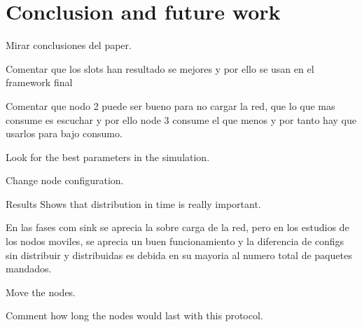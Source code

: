 \chapter{Conclusion and future work}
\label{chap:conclusionsandfuture}

Mirar conclusiones del paper.

Comentar que los slots han resultado se mejores y por ello se usan en el framework final

Comentar que nodo 2 puede ser bueno para no cargar la red, que lo que mas consume es escuchar y por ello node 3 consume el que menos y por tanto
hay que usarlos para bajo consumo. 


Look for the best parameters in the simulation.

Change node configuration.

Results Shows that distribution in time is really important.

En las fases com sink se aprecia la sobre carga de la red, pero en los estudios de los nodos moviles, se aprecia un buen funcionamiento y la diferencia
de configs sin distribuir y distribuidas es debida en su mayoria al numero total de paquetes mandados.

Move the nodes.

Comment how long the nodes would last with this protocol.